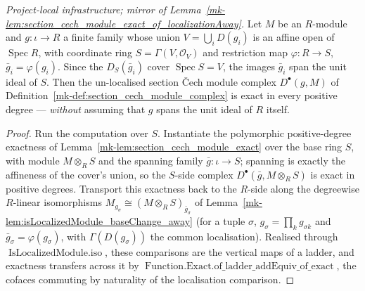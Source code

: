 \begin{lemma}
  \label{mk-lem:section_cech_module_exact_of_affineCover}

  \textit{Project-local infrastructure; mirror of
  Lemma~\ref{mk-lem:section_cech_module_exact_of_localizationAway}.}
  Let \(M\) be an \(R\)-module and \(g : \iota \to R\) a finite family whose union
  \(V = \bigcup_i D(g_i)\) is an affine open of \(\operatorname{Spec} R\), with coordinate ring
  \(S = \Gamma(V, \mathcal{O}_V)\) and restriction map \(\varphi : R \to S\), \(\bar g_i = \varphi(g_i)\).
  Since the \(D_S(\bar g_i)\) cover \(\operatorname{Spec} S = V\), the images \(\bar g_i\) span the unit
  ideal of \(S\). Then the un-localised section {\v C}ech module complex \(D^\bullet(g, M)\) of
  Definition~\ref{mk-def:section_cech_module_complex} is exact in every positive degree --- \emph{without}
  assuming that \(g\) spans the unit ideal of \(R\) itself.
\end{lemma}
\begin{proof}
  Run the computation over \(S\). Instantiate the polymorphic positive-degree exactness of
  Lemma~\ref{mk-lem:section_cech_module_exact} over the base ring \(S\), with module \(M \otimes_R S\) and
  the spanning family \(\bar g : \iota \to S\); spanning is exactly the affineness of the cover's union,
  so the \(S\)-side complex \(D^\bullet(\bar g, M \otimes_R S)\) is exact in positive degrees. Transport
  this exactness back to the \(R\)-side along the degreewise \(R\)-linear isomorphisms
  \(M_{g_\sigma} \cong (M \otimes_R S)_{\bar g_\sigma}\) of
  Lemma~\ref{mk-lem:isLocalizedModule_baseChange_away} (for a tuple \(\sigma\),
  \(g_\sigma = \prod_k g_{\sigma k}\) and \(\bar g_\sigma = \varphi(g_\sigma)\), with
  \(\Gamma(D(g_\sigma))\) the common localisation). Realised through \(\operatorname{IsLocalizedModule.iso}\),
  these comparisons are the vertical maps of a ladder, and exactness transfers across it by
  \(\operatorname{Function.Exact.of\_ladder\_addEquiv\_of\_exact}\), the cofaces commuting by naturality
  of the localisation comparison.
\end{proof}

